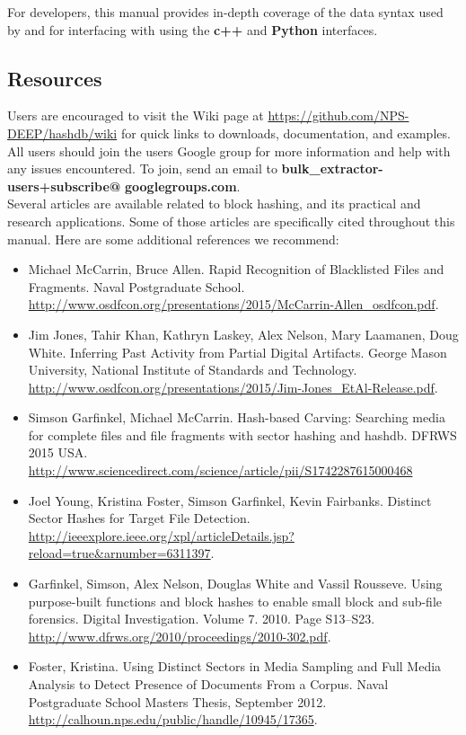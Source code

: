 \documentclass[11pt,fleqn]{article} %
\begin{document}
For developers, this manual provides in-depth coverage of the data syntax used by \hdb and for interfacing with \hdb using the \hdb \textbf{c++} and \textbf{Python} interfaces.

\subsection{\hdb Resources}
Users are encouraged to visit the \hdb Wiki page at \url{https://github.com/NPS-DEEP/hashdb/wiki} for quick links to downloads, documentation, and examples.\\

All \hdb users should join the \bulk users Google group for more information and help with any issues encountered. To join, send an email to \textbf{bulk\_extractor-users+subscribe@} \textbf{googlegroups.com}.  \\

Several articles are available related to block hashing, and its practical and research applications. Some of those articles are specifically cited throughout this manual. Here are some additional references we recommend:
\begin{itemize}
\item Michael McCarrin, Bruce Allen. Rapid Recognition of Blacklisted Files and Fragments. Naval Postgraduate School. \url{http://www.osdfcon.org/presentations/2015/McCarrin-Allen_osdfcon.pdf}.
\item Jim Jones, Tahir Khan, Kathryn Laskey, Alex Nelson, Mary Laamanen, Doug White.  Inferring Past Activity from Partial Digital Artifacts. George Mason University, National Institute of Standards and Technology. \url{http://www.osdfcon.org/presentations/2015/Jim-Jones_EtAl-Release.pdf}.
\item Simson Garfinkel, Michael McCarrin. Hash-based Carving: Searching media for complete files and file fragments with sector hashing and hashdb. DFRWS 2015 USA. \url{http://www.sciencedirect.com/science/article/pii/S1742287615000468}
\item Joel Young, Kristina Foster, Simson Garfinkel, Kevin Fairbanks. Distinct Sector Hashes for Target File Detection. \url{http://ieeexplore.ieee.org/xpl/articleDetails.jsp?reload=true&arnumber=6311397}.
\item Garfinkel, Simson, Alex Nelson, Douglas White and Vassil Rousseve. Using purpose-built functions and block hashes to enable small block and sub-file forensics. Digital Investigation. Volume 7. 2010. Page S13--S23. \url{http://www.dfrws.org/2010/proceedings/2010-302.pdf}.
\item Foster, Kristina. Using Distinct Sectors in Media Sampling and Full Media Analysis to Detect Presence of Documents From a Corpus. Naval Postgraduate School Masters Thesis, September 2012. \url{http://calhoun.nps.edu/public/handle/10945/17365}.
\end{itemize}
\end{document}

